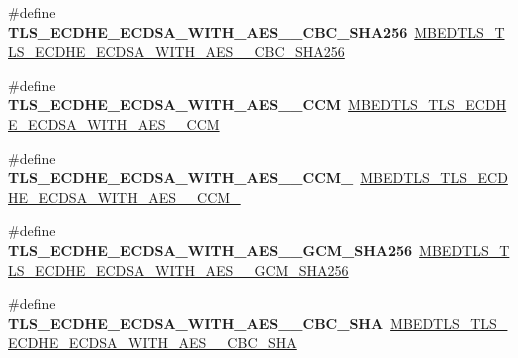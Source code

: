 \begin{DoxyCompactItemize}
\item 
\mbox{\label{compat-1_83_8h_a401c11fa2f370f504deb0aaecca8d9ad}} 
\#define {\bfseries T\+L\+S\+\_\+\+E\+C\+D\+H\+E\+\_\+\+E\+C\+D\+S\+A\+\_\+\+W\+I\+T\+H\+\_\+\+A\+E\+S\+\_\+\_\+\+C\+B\+C\+\_\+\+S\+H\+A256}~\mbox{\hyperlink{ssl__ciphersuites_8h_abd3d4b82de52f23d9f852b74b3897cdc}{M\+B\+E\+D\+T\+L\+S\+\_\+\+T\+L\+S\+\_\+\+E\+C\+D\+H\+E\+\_\+\+E\+C\+D\+S\+A\+\_\+\+W\+I\+T\+H\+\_\+\+A\+E\+S\+\_\+\_\+\+C\+B\+C\+\_\+\+S\+H\+A256}}
\item 
\mbox{\label{compat-1_83_8h_a487efc0ff5a09743878ca5c52896b325}} 
\#define {\bfseries T\+L\+S\+\_\+\+E\+C\+D\+H\+E\+\_\+\+E\+C\+D\+S\+A\+\_\+\+W\+I\+T\+H\+\_\+\+A\+E\+S\+\_\+\_\+\+C\+CM}~\mbox{\hyperlink{ssl__ciphersuites_8h_a0c16b21dabaf2bad2c925ba32b8a0241}{M\+B\+E\+D\+T\+L\+S\+\_\+\+T\+L\+S\+\_\+\+E\+C\+D\+H\+E\+\_\+\+E\+C\+D\+S\+A\+\_\+\+W\+I\+T\+H\+\_\+\+A\+E\+S\+\_\+\_\+\+C\+CM}}
\item 
\mbox{\label{compat-1_83_8h_a5831ef2a636580afc137f3132e7233e9}} 
\#define {\bfseries T\+L\+S\+\_\+\+E\+C\+D\+H\+E\+\_\+\+E\+C\+D\+S\+A\+\_\+\+W\+I\+T\+H\+\_\+\+A\+E\+S\+\_\+\_\+\+C\+C\+M\+\_}~\mbox{\hyperlink{ssl__ciphersuites_8h_afd212c1204b13e30fcffb1e5800a293f}{M\+B\+E\+D\+T\+L\+S\+\_\+\+T\+L\+S\+\_\+\+E\+C\+D\+H\+E\+\_\+\+E\+C\+D\+S\+A\+\_\+\+W\+I\+T\+H\+\_\+\+A\+E\+S\+\_\+\_\+\+C\+C\+M\+\_}}
\item 
\mbox{\label{compat-1_83_8h_a3d7ef0a6518f1f638f2348d99eefb17a}} 
\#define {\bfseries T\+L\+S\+\_\+\+E\+C\+D\+H\+E\+\_\+\+E\+C\+D\+S\+A\+\_\+\+W\+I\+T\+H\+\_\+\+A\+E\+S\+\_\+\_\+\+G\+C\+M\+\_\+\+S\+H\+A256}~\mbox{\hyperlink{ssl__ciphersuites_8h_a2cedef0e0bfae1a154084add0280e975}{M\+B\+E\+D\+T\+L\+S\+\_\+\+T\+L\+S\+\_\+\+E\+C\+D\+H\+E\+\_\+\+E\+C\+D\+S\+A\+\_\+\+W\+I\+T\+H\+\_\+\+A\+E\+S\+\_\+\_\+\+G\+C\+M\+\_\+\+S\+H\+A256}}
\item 
\mbox{\label{compat-1_83_8h_ac5bbbda5d30db5b78213e0a53c41e5f6}} 
\#define {\bfseries T\+L\+S\+\_\+\+E\+C\+D\+H\+E\+\_\+\+E\+C\+D\+S\+A\+\_\+\+W\+I\+T\+H\+\_\+\+A\+E\+S\+\_\+\_\+\+C\+B\+C\+\_\+\+S\+HA}~\mbox{\hyperlink{ssl__ciphersuites_8h_a866e8a6b985204fc3e8111ef506d94b4}{M\+B\+E\+D\+T\+L\+S\+\_\+\+T\+L\+S\+\_\+\+E\+C\+D\+H\+E\+\_\+\+E\+C\+D\+S\+A\+\_\+\+W\+I\+T\+H\+\_\+\+A\+E\+S\+\_\+\_\+\+C\+B\+C\+\_\+\+S\+HA}}

\end{DoxyCompactItemize}
